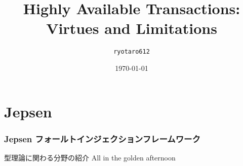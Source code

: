 \documentclass[unicode, 14pt, aspectratio=169]{beamer}
\date{\today}
\title{Highly Available Transactions: \\Virtues and Limitations}
\author{\texttt{ryotaro612}}
\begin{document}
\begin{frame}
\titlepage
\end{frame}
\section{Jepsen}
\begin{frame}
  \frametitle{Jepsen フォールトインジェクションフレームワーク}
  {\large 型理論に関わる分野の紹介}
  All in the golden afternoon
\end{frame}
\end{document}
